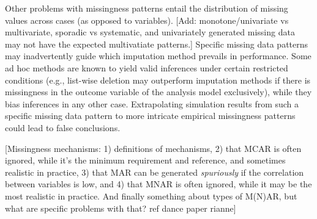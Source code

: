 \documentclass[bimj,fleqn]{w-art}
\theoremstyle{plain}
\theoremstyle{definition}
\begin{document}

Other problems with missingness patterns entail the distribution of missing values across cases (as opposed to variables). [Add: monotone/univariate vs multivariate, sporadic vs systematic, and univariately generated missing data may not have the expected multivatiate patterns.] Specific missing data patterns may inadvertently guide which imputation method prevails in performance. Some ad hoc methods are known to yield valid inferences under certain restricted conditions (e.g., list-wise deletion may outperform imputation methods if there is missingness in the outcome variable of the analysis model exclusively), while they bias inferences in any other case. Extrapolating simulation results from such a specific missing data pattern to more intricate empirical missingness patterns could lead to false conclusions. 

[Missingness mechanisms: 1) definitions of mechanisms, 2) that MCAR is often ignored, while it's the minimum requirement and reference, and sometimes realistic in practice, 3) that MAR can be generated \textit{spuriously} if the correlation between variables is low, and 4) that MNAR is often ignored, while it may be the most realistic in practice. And finally something about types of M(N)AR, but what are specific problems with that? ref dance paper rianne]

\end{document}
